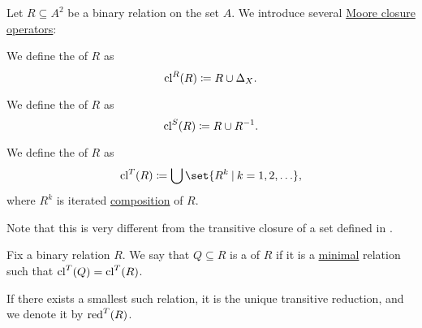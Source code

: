 \begin{definition}\label{def:relation_closures}\mimprovised
  Let \( R \subseteq A^2 \) be a binary relation on the set \( A \). We introduce several \hyperref[def:moore_closure_operator]{Moore closure operators}:
  \begin{thmenum}
     We define the  of \( R \) as
    \begin{equation*}
      \operatorname{cl}^R(R) \coloneqq R \cup \Delta_X.
    \end{equation*}

     We define the  of \( R \) as
    \begin{equation*}
      \operatorname{cl}^S(R) \coloneqq R \cup R^{-1}.
    \end{equation*}

     We define the  of \( R \) as
    \begin{equation*}
      \cl^T(R) \coloneqq \bigcup \set{ R^k \given k = 1, 2, \ldots },
    \end{equation*}
    where \( R^k \) is iterated \hyperref[def:binary_relation/composition]{composition} of \( R \).

    Note that this is very different from the transitive closure of a set defined in .
  \end{thmenum}
\end{definition}

\begin{definition}\label{def:transitive_reduction}\mimprovised
  Fix a binary relation \( R \). We say that \( Q \subseteq R \) is a  of \( R \) if it is a \hyperref[def:extremal_points/maximal_and_minimal_element]{minimal} relation such that \( \operatorname{cl}^T(Q) = \operatorname{cl}^T(R) \).

  If there exists a smallest such relation, it is the unique transitive reduction, and we denote it by \( \operatorname{red}^T(R) \).
\end{definition}

